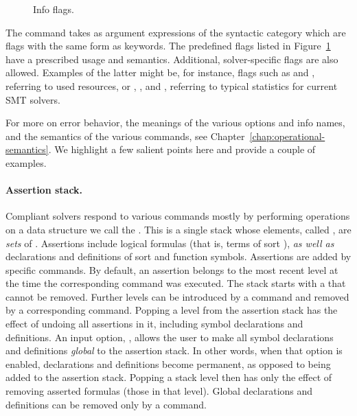 \begin{figure}
\small
\cInfoFlags
\caption{Info flags.}
\label{fig:info-flags}
\end{figure}

The command  takes as argument 
expressions of the syntactic category 
which are flags with the same form as keywords.
The predefined flags listed in Figure~\ref{fig:info-flags} have 
a prescribed usage and semantics.
Additional, solver-specific flags are also allowed.
Examples of the latter might be, for instance, flags such as
 and , referring to used resources, or  
, , and ,
referring to typical statistics for current SMT solvers. 

For more on error behavior, the meanings of the various options and info names,
and the semantics of the various commands, 
see Chapter~\ref{chap:operational-semantics}.
We highlight a few salient points here and provide a couple of examples.


\paragraph{Assertion stack.} 
Compliant solvers respond to various commands mostly by performing operations 
on a data structure we call the .  
This is a single stack whose elements, called ,
are \emph{sets} of . 
Assertions include logical formulas (that is, terms of sort ), 
\emph{as well as} declarations and definitions of sort and function symbols.
Assertions are added by specific commands.
By default, an assertion belongs to the most recent level
at the time the corresponding command was executed.
The stack starts with a  
that cannot be removed.
Further levels can be introduced by a  command and 
removed by a corresponding  command.
Popping a level from the assertion stack has the effect of undoing 
all assertions in it, including symbol declarations and definitions.
An input option, , allows the user to make 
all symbol declarations and definitions \emph{global} to the assertion stack.
In other words, when that option is enabled, declarations and definitions become
permanent, as opposed to being added to the assertion stack.
Popping a stack level then has only the effect of removing asserted formulas 
(those in that level).
Global declarations and definitions can be removed only by a  command.

